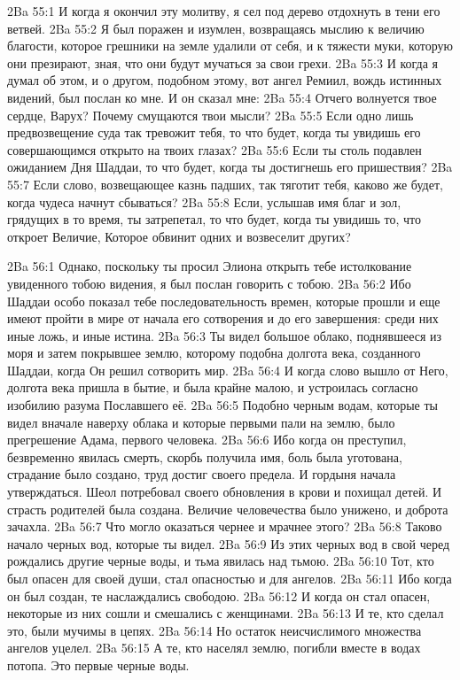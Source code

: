 \vs 2Ba 55:1
И когда я окончил эту молитву, я сел под дерево отдохнуть в тени его ветвей.
\vs 2Ba 55:2
Я был поражен и изумлен, возвращаясь мыслию к величию благости, которое грешники на земле удалили от себя, и к тяжести муки, которую они презирают, зная, что они будут мучаться за свои грехи.
\vs 2Ba 55:3
И когда я думал об этом, и о другом, подобном этому, вот ангел Ремиил, вождь истинных видений, был послан ко мне. И он сказал мне:
\vs 2Ba 55:4
Отчего волнуется твое сердце, Варух? Почему смущаются твои мысли?
\vs 2Ba 55:5
Если одно лишь предвозвещение суда так тревожит тебя, то что будет, когда ты увидишь его совершающимся открыто на твоих глазах?
\vs 2Ba 55:6
Если ты столь подавлен ожиданием Дня Шаддаи, то что будет, когда ты достигнешь его пришествия?
\vs 2Ba 55:7
Если слово, возвещающее казнь падших, так тяготит тебя, каково же будет, когда чудеса начнут сбываться?
\vs 2Ba 55:8
Если, услышав имя благ и зол, грядущих в то время, ты затрепетал, то что будет, когда ты увидишь то, что откроет Величие, Которое обвинит одних и возвеселит других?

\vs 2Ba 56:1
Однако, поскольку ты просил Элиона открыть тебе истолкование увиденного тобою видения, я был послан говорить с тобою.
\vs 2Ba 56:2
Ибо Шаддаи особо показал тебе последовательность времен, которые прошли и еще имеют пройти в мире от начала его сотворения и до его завершения: среди них иные ложь, и иные истина.
\vs 2Ba 56:3
Ты видел большое облако, поднявшееся из моря и затем покрывшее землю, которому подобна долгота века, созданного Шаддаи, когда Он решил сотворить мир.
\vs 2Ba 56:4
И когда слово вышло от Него, долгота века пришла в бытие, и была крайне малою, и устроилась согласно изобилию разума Пославшего её.
\vs 2Ba 56:5
Подобно черным водам, которые ты видел вначале наверху облака и которые первыми пали на землю, было прегрешение Адама, первого человека.
\vs 2Ba 56:6
Ибо когда он преступил, безвременно явилась смерть, скорбь получила имя, боль была уготована, страдание было создано, труд достиг своего предела. И гордыня начала утверждаться. Шеол потребовал своего обновления в крови и похищал детей. И страсть родителей была создана. Величие человечества было унижено, и доброта зачахла.
\vs 2Ba 56:7
Что могло оказаться чернее и мрачнее этого?
\vs 2Ba 56:8
Таково начало черных вод, которые ты видел.
\vs 2Ba 56:9
Из этих черных вод в свой черед рождались другие черные воды, и тьма явилась над тьмою.
\vs 2Ba 56:10
Тот, кто был опасен для своей души, стал опасностью и для ангелов.
\vs 2Ba 56:11
Ибо когда он был создан, те наслаждались свободою.
\vs 2Ba 56:12
И когда он стал опасен, некоторые из них сошли и смешались с женщинами.
\vs 2Ba 56:13
И те, кто сделал это, были мучимы в цепях.
\vs 2Ba 56:14
Но остаток неисчислимого множества ангелов уцелел.
\vs 2Ba 56:15
А те, кто населял землю, погибли вместе в водах потопа. Это первые черные воды.

